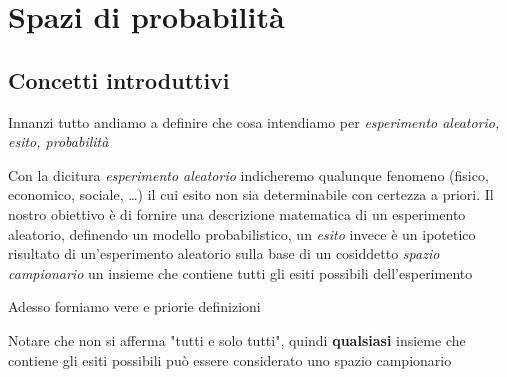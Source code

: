 % 
\newcommand{\assiomalabel}[1]{\refstepcounter{assiomacounter}\label{#1}\textbf{Assioma \theassiomacounter.}}

\chapter{Spazi di probabilità}
\section{Concetti introduttivi}
Innanzi tutto andiamo a definire che cosa intendiamo per \textit{esperimento aleatorio, esito, probabilità}

Con la dicitura \textit{esperimento aleatorio} indicheremo qualunque fenomeno (fisico, economico, sociale, \dots ) il cui esito non sia determinabile con certezza a priori. Il nostro obiettivo è di fornire una descrizione matematica di un esperimento aleatorio, definendo un modello probabilistico, un \textit{esito} invece è un ipotetico risultato di un'esperimento aleatorio sulla base di un cosiddetto \textit{spazio campionario} un insieme che contiene tutti gli esiti possibili dell’esperimento



Adesso forniamo vere e priorie definizioni


Notare che non si afferma "tutti e solo tutti", quindi \textbf{qualsiasi} insieme che contiene gli esiti possibili può essere considerato uno spazio campionario

